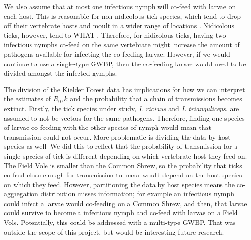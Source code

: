 \documentclass{article}
\begin{document}
We also assume that at most one infectious nymph will co-feed with larvae on each host. This is reasonable for non-nidicolous tick species, which tend to drop off their vertebrate hosts and moult in a wider range of locations \cite{}. Nidicolous ticks, however, tend to WHAT \cite{}. Therefore, for nidicolous ticks, having two infectious nymphs co-feed on the same vertebrate might increase the amount of pathogens available for infecting the co-feeding larvae. However, if we would continue to use a single-type GWBP, then the co-feeding larvae would need to be divided amongst the infected nymphs. 


The division of the Kielder Forest data has implications for how we can interpret the estimates of $ R_0, k $ and the probability that a chain of transmissions becomes extinct. Firstly, the tick species under study, \textit{I. ricinus} and \textit{I. trianguliceps}, are assumed to not be vectors for the same pathogens. Therefore, finding one species of larvae co-feeding with the other species of nymph would mean that transmission could not occur. More problematic is dividing the data by host species as well. We did this to reflect that the probability of transmission for a single species of tick is different depending on which vertebrate host they feed on. The Field Vole is smaller than the Common Shrew, so the probability that ticks co-feed close enough for transmission to occur would depend on the host species on which they feed. However, partitioning the data by host species means the co-aggregation distribution misses information; for example an infectious nymph could infect a larvae would co-feeding on a Common Shrew, and then, that larvae could survive to become a infectious nymph and co-feed with larvae on a Field Vole. Potentially, this could be addressed with a multi-type GWBP. That was outside the scope of this project, but would be interesting future research.
\end{document}
